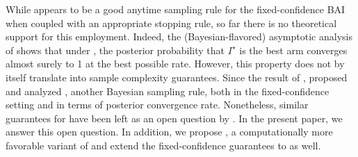 While \TTTS appears to be a good anytime sampling rule for the fixed-confidence BAI when coupled with an appropriate stopping rule, so far there is no theoretical support for this employment. Indeed, the (Bayesian-flavored) asymptotic analysis of \cite{russo2016ttts} shows that under \TTTS, the posterior probability that $I^\star$ is the best arm converges almost surely to 1 at the best possible rate. However, this property does not by itself translate into sample complexity guarantees. Since the result of \cite{russo2016ttts}, \citet{qin2017ttei} proposed and analyzed \TTEI, another Bayesian sampling rule, both in the fixed-confidence setting and in terms of posterior convergence rate. Nonetheless, similar guarantees for \TTTS have been left as an open question by \cite{russo2016ttts}. In the present paper, we answer this open question. In addition, we propose \TCC, a computationally more favorable variant of \TTTS and  extend the fixed-confidence guarantees to \TCC as well.



 

